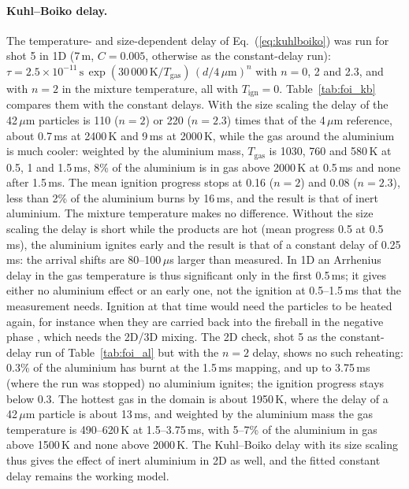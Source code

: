 \documentclass{article}
\begin{document}
\paragraph{Kuhl--Boiko delay.} The temperature- and size-dependent delay of Eq.~(\ref{eq:kuhlboiko}) was run for shot 5 in 1D (7\,m, $C = 0.005$, otherwise as the constant-delay run): $\tau = 2.5\times10^{-11}\,\text{s}\,\exp(30\,000\,\text{K}/T_\text{gas})\,(d/4\,\mu\text{m})^{n}$ with $n = 0$, 2 and 2.3, and with $n = 2$ in the mixture temperature, all with $T_\text{ign} = 0$. Table~\ref{tab:foi_kb} compares them with the constant delays. With the size scaling the delay of the 42\,$\mu$m particles is 110 ($n = 2$) or 220 ($n = 2.3$) times that of the 4\,$\mu$m reference, about 0.7\,ms at 2400\,K and 9\,ms at 2000\,K, while the gas around the aluminium is much cooler: weighted by the aluminium mass, $T_\text{gas}$ is 1030, 760 and 580\,K at 0.5, 1 and 1.5\,ms, 8\% of the aluminium is in gas above 2000\,K at 0.5\,ms and none after 1.5\,ms. The mean ignition progress stops at 0.16 ($n = 2$) and 0.08 ($n = 2.3$), less than 2\% of the aluminium burns by 16\,ms, and the result is that of inert aluminium. The mixture temperature makes no difference. Without the size scaling the delay is short while the products are hot (mean progress 0.5 at 0.5\,ms), the aluminium ignites early and the result is that of a constant delay of 0.25\,ms: the arrival shifts are 80--100\,$\mu$s larger than measured. In 1D an Arrhenius delay in the gas temperature is thus significant only in the first 0.5\,ms; it gives either no aluminium effect or an early one, not the ignition at 0.5--1.5\,ms that the measurement needs. Ignition at that time would need the particles to be heated again, for instance when they are carried back into the fireball in the negative phase \cite{posey2021}, which needs the 2D/3D mixing. The 2D check, shot 5 as the constant-delay run of Table~\ref{tab:foi_al} but with the $n = 2$ delay, shows no such reheating: 0.3\% of the aluminium has burnt at the 1.5\,ms mapping, and up to 3.75\,ms (where the run was stopped) no aluminium ignites; the ignition progress stays below 0.3. The hottest gas in the domain is about 1950\,K, where the delay of a 42\,$\mu$m particle is about 13\,ms, and weighted by the aluminium mass the gas temperature is 490--620\,K at 1.5--3.75\,ms, with 5--7\% of the aluminium in gas above 1500\,K and none above 2000\,K. The Kuhl--Boiko delay with its size scaling thus gives the effect of inert aluminium in 2D as well, and the fitted constant delay remains the working model.
\end{document}

